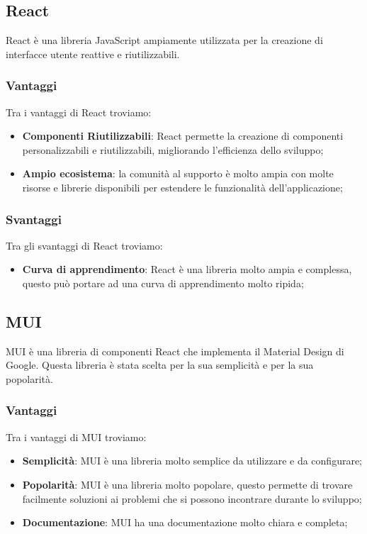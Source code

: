 \subsection*{React}
React è una libreria JavaScript ampiamente utilizzata per la creazione di interfacce utente reattive e riutilizzabili.

\subsubsection*{Vantaggi}
Tra i vantaggi di React troviamo:
\begin{itemize}
    \item \textbf{Componenti Riutilizzabili}: React permette la creazione di componenti personalizzabili e riutilizzabili, migliorando l'efficienza dello sviluppo;
    \item \textbf{Ampio ecosistema}: la comunità al supporto è molto ampia con molte risorse e librerie disponibili per estendere le funzionalità dell'applicazione;
\end{itemize}

\subsubsection*{Svantaggi}
Tra gli svantaggi di React troviamo:
\begin{itemize}
    \item \textbf{Curva di apprendimento}: React è una libreria molto ampia e complessa, questo può portare ad una curva di apprendimento molto ripida;
\end{itemize}


\subsection*{MUI}
MUI è una libreria di componenti React che implementa il Material Design di Google.
Questa libreria è stata scelta per la sua semplicità e per la sua popolarità.

\subsubsection*{Vantaggi}
Tra i vantaggi di MUI troviamo:
\begin{itemize}
    \item \textbf{Semplicità}: MUI è una libreria molto semplice da utilizzare e da configurare;
    \item \textbf{Popolarità}: MUI è una libreria molto popolare, questo permette di trovare facilmente soluzioni ai problemi che si possono incontrare durante lo sviluppo;
    \item \textbf{Documentazione}: MUI ha una documentazione molto chiara e completa;
\end{itemize}

